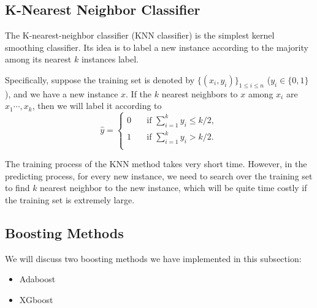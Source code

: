 \documentclass[english]{article}
\begin{document}
\subsection{K-Nearest Neighbor Classifier}
\par The K-nearest-neighbor classifier (KNN classifier) is the simplest kernel smoothing classifier. Its idea is to label a new instance according to the majority among its nearest $k$ instances label.
\par Specifically, suppose the training set is denoted by $\{(x_{i}, y_{i})\}_{1\le i\le n}$ ($y_{i}\in\{0, 1\}$), and we have a new instance $x$. If the $k$ nearest neighbors to $x$ among $x_{i}$ are $x_{1}\cdots, x_{k}$, then we will label it according to
\begin{equation}
	\hat{y} = \begin{cases}
		0 & \quad \text{if }\sum_{i=1}^{k}y_{i}\le k / 2,\\
		1 & \quad \text{if }\sum_{i=1}^{k}y_{i}> k / 2.\\
	\end{cases}
\end{equation}
\par The training process of the KNN method takes very short time. However, in the predicting process, for every new instance, we need to search over the training set to find $k$ nearest neighbor to the new instance, which will be quite time costly if the training set is extremely large.

\subsection{Boosting Methods}
\par We will discuss two boosting methods we have implemented in this subsection:
\begin{itemize}
	\item Adaboost
	\item XGboost
\end{itemize}
\end{document}

